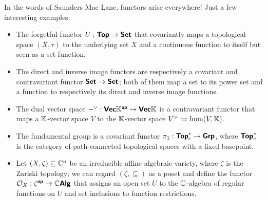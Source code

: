 \documentclass{article}
\begin{document}
In the words of Saunders Mac Lane, functors arise everywhere! Just a few interesting examples:\begin{itemize}
    \item The forgetful functor $U : \text{\sffamily\textbf{Top}} \to \text{\sffamily\textbf{Set}}$ that covariantly maps a topological space $(X,\tau)$ to the underlying set $X$ and a continuous function to itself but seen as a set function.
    \item The direct and inverse image functors are respectively a covariant and contravariant functor $\text{\sffamily\textbf{Set}}\to\text{\sffamily\textbf{Set}}$; both of them map a set to its power set and a function to respectively its direct and inverse image functions.
    \item The dual vector space $-^\vee : \text{\sffamily\textbf{Vec}}\mathbb{K}^{\text{\sffamily\textbf{op}}} \to \text{\sffamily\textbf{Vec}}\mathbb{K}$ is a contravariant functor that maps a $\mathbb{K}$-vector space $V$ to the $\mathbb{K}$-vector space $V^\vee := \hom(V,\mathbb{K})$.
    \item The fundamental group is a covariant functor $\pi_1 : \text{\sffamily\textbf{Top}}_c^* \to \text{\sffamily\textbf{Grp}}$, where $\text{\sffamily\textbf{Top}}_c^*$ is the category of path-connected topological spaces with a fixed basepoint.
    \item Let $(X, \zeta) \subseteq \mathbb{C}^n$ be an irreducible affine algebraic variety, where $\zeta$ is the Zariski topology; we can regard $(\zeta,\subseteq)$ as a poset and define the functor $\mathcal{O}_X : \zeta^{\text{\sffamily\textbf{op}}} \to \mathbb{C}\text{\sffamily\textbf{Alg}}$ that assigns an open set $U$ to the $\mathbb{C}$-algebra of regular functions on $U$ and set inclusions to function restrictions.
\end{itemize}
\end{document}

